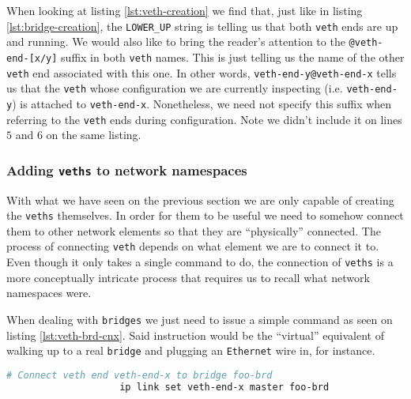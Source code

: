             When looking at listing \ref{lst:veth-creation} we find that, just like in listing \ref{lst:bridge-creation}, the \texttt{LOWER\_UP} string is telling us that both \texttt{veth} ends are up and running. We would also like to bring the reader's attention to the \texttt{@veth-end-[x/y]} suffix in both \texttt{veth} names. This is just telling us the name of the other \texttt{veth} end associated with this one. In other words, \texttt{veth-end-y@veth-end-x} tells us that the \texttt{veth} whose configuration we are currently inspecting (i.e. \texttt{veth-end-y}) is attached to \texttt{veth-end-x}. Nonetheless, we need not specify this suffix when referring to the \texttt{veth} ends during configuration. Note we didn't include it on lines $5$ and $6$ on the same listing.

            \subsubsection{Adding \texttt{veths} to network namespaces}
                With what we have seen on the previous section we are only capable of creating the \texttt{veths} themselves. In order for them to be useful we need to somehow connect them to other network elements so that they are ``physically'' connected. The process of connecting \texttt{veth} depends on what element we are to connect it to. Even though it only takes a single command to do, the connection of \texttt{veths} is a more conceptually intricate process that requires us to recall what network namespaces were.

                When dealing with \texttt{bridges} we just need to issue a simple command as seen on listing \ref{lst:veth-brd-cnx}. Said instruction would be the ``virtual'' equivalent of walking up to a real \texttt{bridge} and plugging an \texttt{Ethernet} wire in, for instance.

                \begin{lstlisting}[language = bash, caption = Connecting a \texttt{veth} end to a virtual \texttt{bridge}., label = lst:veth-brd-cnx]
                    # Connect veth end veth-end-x to bridge foo-brd
                    ip link set veth-end-x master foo-brd
                \end{lstlisting}

